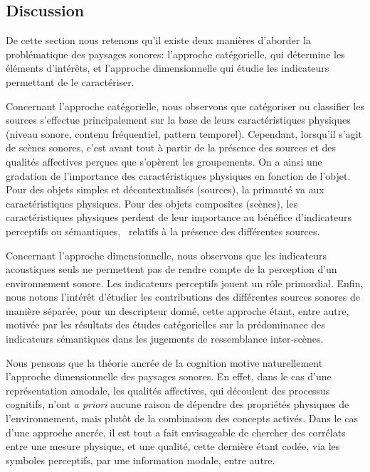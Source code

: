 \subsection{Discussion}
\label{ch3_soundscapeDiscussion}

De cette section nous retenons qu'il existe deux manières d'aborder la problématique des paysages sonores: l'approche catégorielle, qui détermine les éléments d'intérêts, et l'approche dimensionnelle qui étudie les indicateurs permettant de le caractériser.

Concernant l'approche catégorielle, nous observons que catégoriser ou classifier les sources s'effectue principalement sur la base de leurs caractéristiques physiques (niveau sonore, contenu fréquentiel, pattern temporel). Cependant, lorsqu'il s'agit de scènes sonores, c'est avant tout à partir de la présence des sources et des qualités affectives perçues que s'opèrent les groupements. On a ainsi une gradation de l'importance des caractéristiques physiques en fonction de l'objet. Pour des objets simples et décontextualisés (sources), la primauté va aux caractéristiques physiques. Pour des objets composites (scènes), les caractéristiques physiques perdent de leur importance au bénéfice d'indicateurs perceptifs ou sémantiques, \ie~relatifs à la présence des différentes sources.

Concernant l'approche dimensionnelle, nous observons que les indicateurs acoustiques seuls ne permettent pas de rendre compte de la perception d'un environnement sonore. Les indicateurs perceptifs jouent un rôle primordial. Enfin, nous notons l'intérêt d'étudier les contributions des différentes sources sonores de manière séparée, pour un descripteur donné, cette approche étant, entre autre, motivée par les résultats des études catégorielles sur la prédominance des indicateurs sémantiques dans les jugements de ressemblance inter-scènes.

Nous pensons que la théorie ancrée de la cognition motive naturellement l'approche dimensionnelle des paysages sonores. En effet, dans le cas d'une représentation amodale, les qualités affectives, qui découlent des processus cognitifs, n'ont \emph{a priori} aucune raison de dépendre des propriétés physiques de l'environnement, mais plutôt de la combinaison des concepts activés. Dans le cas d'une approche ancrée, il est tout a fait envisageable de chercher des corrélats entre une mesure physique, et une qualité, cette dernière étant codée, via les symboles perceptifs, par une information modale, entre autre.

